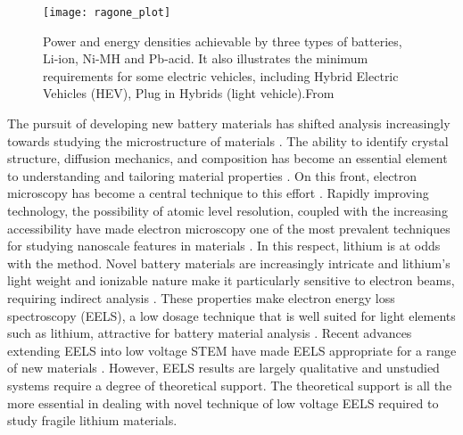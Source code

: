 \begin{figure}
	\centering
	\texttt{[image: ragone\_plot]}
\caption{Power and energy densities achievable by three types of batteries, Li-ion, Ni-MH and Pb-acid. It also illustrates the minimum requirements for some electric vehicles, including Hybrid Electric Vehicles (HEV), Plug in Hybrids (light vehicle).From \cite{etacheri_challenges_2011} }
	\label{ragone}
	
\end{figure}
The pursuit of developing new battery materials has shifted analysis increasingly towards studying the microstructure of materials \cite{lu_lithium_2012,arthur_spontaneous_2016, muller_quantification_2018}. %
The ability to identify crystal structure, diffusion mechanics, and composition has become an essential element to understanding and tailoring material properties \cite{van_der_ven_first-principles_2001}.  On this front, electron microscopy has become a central technique to this effort 
 \cite{chiu_aqueous_2013,inkson_2_2016}.  Rapidly improving technology, the possibility of atomic level resolution, coupled with the increasing accessibility have made electron microscopy one of the most prevalent techniques for studying nanoscale features in materials \cite{hansen_atomic-resolution_2001}.  %
 In this respect, lithium is at odds with the method.  %
 Novel battery materials are increasingly intricate and lithium's light weight and ionizable nature make it particularly sensitive to electron beams, requiring indirect analysis \cite{kobayashi_quantitative_2017}.  These properties make electron energy loss spectroscopy (EELS), a low dosage technique that is well suited for light elements such as lithium, attractive for battery material analysis  \cite{Egerton}. Recent advances extending EELS into low voltage STEM have made EELS appropriate for a range of new materials \cite{SU_9000}. %
  However, EELS results are largely qualitative and unstudied systems require a degree of theoretical support.  The theoretical support is all the more essential in dealing with novel technique of low voltage EELS required to study fragile lithium materials. %

